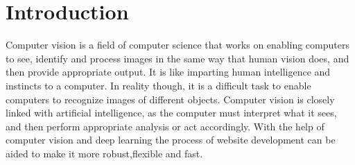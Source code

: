 %

\chapter{Introduction}
Computer vision is a field of computer science that works on enabling computers to see, identify and process images in the same way that human vision does, and then provide appropriate output. It is like imparting human intelligence and instincts to a computer. In reality though, it is a difficult task to enable computers to recognize images of different objects.
Computer vision is closely linked with artificial intelligence, as the computer must interpret what it sees, and then perform appropriate analysis or act accordingly. With the help of computer vision and deep learning the process of website development can be aided to make it more robust,flexible and fast.

